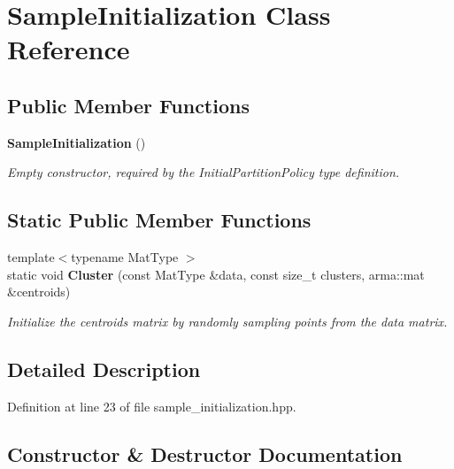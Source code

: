 \section{Sample\+Initialization Class Reference}
\label{classmlpack_1_1kmeans_1_1SampleInitialization}
\subsection*{Public Member Functions}
\begin{DoxyCompactItemize}
\item 
\textbf{ Sample\+Initialization} ()
\begin{DoxyCompactList}\small\item\em Empty constructor, required by the Initial\+Partition\+Policy type definition. \end{DoxyCompactList}\end{DoxyCompactItemize}
\subsection*{Static Public Member Functions}
\begin{DoxyCompactItemize}
\item 
{\footnotesize template$<$typename Mat\+Type $>$ }\\static void \textbf{ Cluster} (const Mat\+Type \&data, const size\+\_\+t clusters, arma\+::mat \&centroids)
\begin{DoxyCompactList}\small\item\em Initialize the centroids matrix by randomly sampling points from the data matrix. \end{DoxyCompactList}\end{DoxyCompactItemize}


\subsection{Detailed Description}


Definition at line 23 of file sample\+\_\+initialization.\+hpp.



\subsection{Constructor \& Destructor Documentation}
\mbox{\label{classmlpack_1_1kmeans_1_1SampleInitialization_a47289aac77d670ddc14b58336fb5b051}} 
